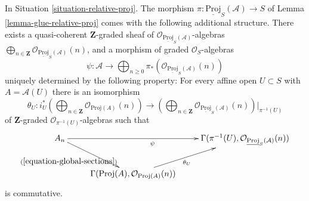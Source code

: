 \begin{lemma}
\label{lemma-glue-relative-proj-twists}
In Situation \ref{situation-relative-proj}.
The morphism $\pi : \underline{\text{Proj}}_S(\mathcal{A}) \to S$
of Lemma \ref{lemma-glue-relative-proj} comes with the following
additional structure.
There exists a quasi-coherent $\mathbf{Z}$-graded sheaf
of $\mathcal{O}_{\underline{\text{Proj}}_S(\mathcal{A})}$-algebras
$\bigoplus\nolimits_{n \in \mathbf{Z}}
\mathcal{O}_{\underline{\text{Proj}}_S(\mathcal{A})}(n)$,
and a morphism of graded $\mathcal{O}_S$-algebras
$$
\psi :
\mathcal{A}
\longrightarrow
\bigoplus\nolimits_{n \geq 0}
\pi_*\left(\mathcal{O}_{\underline{\text{Proj}}_S(\mathcal{A})}(n)\right)
$$
uniquely determined by the following property:
For every affine open $U \subset S$ with $A = \mathcal{A}(U)$
there is an isomorphism
$$
\theta_U :
i_U^*\left(
\bigoplus\nolimits_{n \in \mathbf{Z}} \mathcal{O}_{\text{Proj}(A)}(n)
\right)
\longrightarrow
\left(
\bigoplus\nolimits_{n \in \mathbf{Z}}
\mathcal{O}_{\underline{\text{Proj}}_S(\mathcal{A})}(n)
\right)|_{\pi^{-1}(U)}
$$
of $\mathbf{Z}$-graded $\mathcal{O}_{\pi^{-1}(U)}$-algebras
such that
$$
\xymatrix{
A_n
\ar[rr]_\psi
\ar[dr]_-{(\ref{equation-global-sections})}
& &
\Gamma(\pi^{-1}(U),
\mathcal{O}_{\underline{\text{Proj}}_S(\mathcal{A})}(n)) \\
&
\Gamma(\text{Proj}(A),
\mathcal{O}_{\text{Proj}(A)}(n))
\ar[ru]_-{\theta_U}
&
}
$$
is commutative.
\end{lemma}

